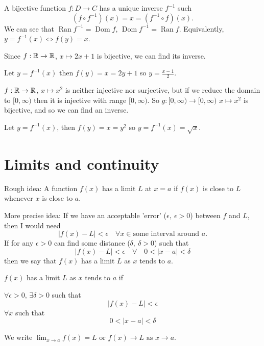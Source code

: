 \documentclass[10pt, a4paper]{article}
\DeclareMathOperator{\Dom}{Dom}
\DeclareMathOperator{\Ran}{Ran}
\begin{document}
A bijective function $f : D \rightarrow C$ has a unique inverse $f ^ {-1}$ such 
\[
(f \circ f ^ {-1})(x) = x = (f ^ {-1} \circ f)(x).
\]
We can see that $\Ran f ^ {-1} = \Dom f$, $\Dom f ^ {-1} = \Ran f$. Equivalently, $y = f ^ {-1} (x) \iff f(y) = x$.

\begin{example}
    Since $f : \mathbb{R} \rightarrow \mathbb{R}$, $x \mapsto 2x + 1$ is bijective, we can find its inverse.

    Let $y = f^{-1}(x)$ then $f(y) = x = 2y + 1$ so $y = \frac{x - 1}{2}$.
\end{example}

\begin{example}
    $f : \mathbb{R} \rightarrow \mathbb{R}$, $x \mapsto x ^ 2$ is neither injective nor surjective, but if we reduce the domain to $[0, \infty)$ then it is injective with range $[0, \infty)$. So $g : [0, \infty) \rightarrow [0, \infty)$ $x \mapsto x ^ 2$ is bijective, and so we can find an inverse.

    Let $y = f^{-1}(x)$, then $f(y) = x = y ^ 2$ so $y = f^{-1}(x) = \sqrt{x}$.
\end{example}

\newpage

\section{Limits and continuity}

Rough idea: A function $f(x)$ has a limit $L$ at $x = a$ if $f(x)$ is close to $L$ whenever $x$ is close to $a$.

More precise idea: If we have an acceptable 'error' ($\epsilon,\ \epsilon > 0$) between $f$ and $L$, then I would need
\[
|f(x) - L| < \epsilon\quad\forall x \in \text{some interval around } a.
\]
If for any $\epsilon > 0$ can find some distance ($\delta,\ \delta > 0$) such that
\[
|f(x) - L| < \epsilon\quad\forall\quad 0 < |x - a| < \delta
\]
then we say that $f(x)$ has a limit $L$ as $x$ tends to $a$.

\begin{definition}
    $f(x)$ has a limit $L$ as $x$ tends to $a$ if
    
    $\forall \epsilon > 0,\,\exists \delta > 0$ such that
    \[
    |f(x) - L| < \epsilon
    \]
    $\forall x$ such that
    \[
    0 < |x - a| < \delta
    \]
\end{definition}
We write $\displaystyle\lim_{x \rightarrow a}f(x) = L$ or $f(x) \rightarrow L \text{ as } x \rightarrow a$.
\end{document}
